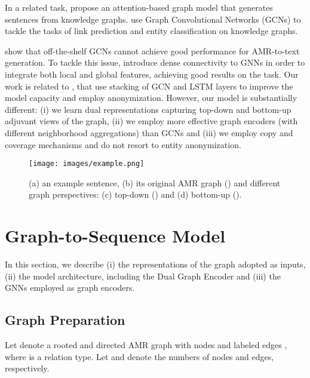 \documentclass[11pt,a4paper]{article}
\begin{document}
In a related task, \citet{rik_naacl19} propose an attention-based graph model that generates sentences from knowledge graphs. \citet{Schlichtkrull2018ModelingRD} use Graph Convolutional Networks (GCNs) to tackle the tasks of link prediction and entity classification on knowledge graphs.   


\citet{damonte_naacl18} show that off-the-shelf GCNs cannot achieve good performance for \mbox{AMR-to-text} generation. To tackle this issue, \citet{dcgcnforgraph2seq19guo} introduce dense connectivity to GNNs in order to integrate both local and global features, achieving good results on the task. Our work is related to \citet{damonte_naacl18}, that use stacking of GCN and LSTM layers to improve the model capacity and employ anonymization. However, our model is substantially different: (i) we learn dual representations capturing top-down and bottom-up adjuvant views of the graph, (ii) we employ more effective graph encoders (with different neighborhood aggregations) than GCNs and (iii) we employ copy and coverage mechanisms and do not resort to entity anonymization.

 \begin{figure*}
    \centering
    \texttt{[image: images/example.png]}
    \caption{(a) an example sentence, (b) its original AMR graph () and different graph perspectives: (c) top-down () and (d) bottom-up ().}
    \label{fig:rep_graphs}
\end{figure*}



\section{Graph-to-Sequence Model}
In this section, we describe (i) the representations of the graph adopted as inputs, (ii) the model architecture, including the Dual Graph Encoder and (iii) the GNNs employed as graph encoders.



\subsection{Graph Preparation} 
Let  denote a rooted and directed AMR graph with nodes  and labeled edges , where  is a relation type. Let  and  denote the numbers of nodes and edges, respectively. 
\end{document}
